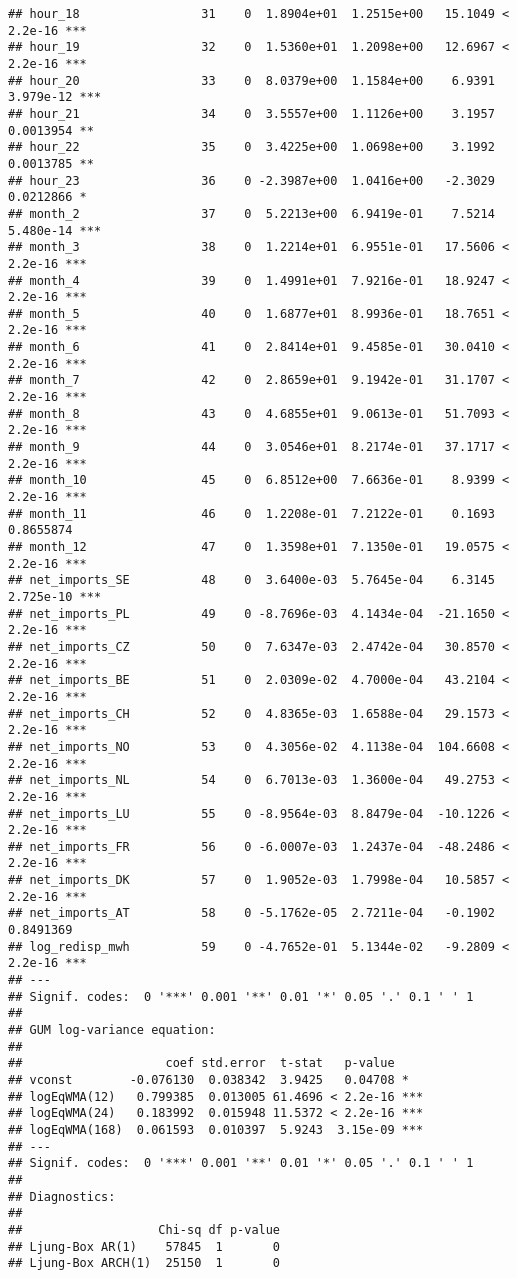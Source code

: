 \documentclass[
]{article}
\begin{document}
\begin{verbatim}
## hour_18                 31    0  1.8904e+01  1.2515e+00   15.1049 < 2.2e-16 ***
## hour_19                 32    0  1.5360e+01  1.2098e+00   12.6967 < 2.2e-16 ***
## hour_20                 33    0  8.0379e+00  1.1584e+00    6.9391 3.979e-12 ***
## hour_21                 34    0  3.5557e+00  1.1126e+00    3.1957 0.0013954 ** 
## hour_22                 35    0  3.4225e+00  1.0698e+00    3.1992 0.0013785 ** 
## hour_23                 36    0 -2.3987e+00  1.0416e+00   -2.3029 0.0212866 *  
## month_2                 37    0  5.2213e+00  6.9419e-01    7.5214 5.480e-14 ***
## month_3                 38    0  1.2214e+01  6.9551e-01   17.5606 < 2.2e-16 ***
## month_4                 39    0  1.4991e+01  7.9216e-01   18.9247 < 2.2e-16 ***
## month_5                 40    0  1.6877e+01  8.9936e-01   18.7651 < 2.2e-16 ***
## month_6                 41    0  2.8414e+01  9.4585e-01   30.0410 < 2.2e-16 ***
## month_7                 42    0  2.8659e+01  9.1942e-01   31.1707 < 2.2e-16 ***
## month_8                 43    0  4.6855e+01  9.0613e-01   51.7093 < 2.2e-16 ***
## month_9                 44    0  3.0546e+01  8.2174e-01   37.1717 < 2.2e-16 ***
## month_10                45    0  6.8512e+00  7.6636e-01    8.9399 < 2.2e-16 ***
## month_11                46    0  1.2208e-01  7.2122e-01    0.1693 0.8655874    
## month_12                47    0  1.3598e+01  7.1350e-01   19.0575 < 2.2e-16 ***
## net_imports_SE          48    0  3.6400e-03  5.7645e-04    6.3145 2.725e-10 ***
## net_imports_PL          49    0 -8.7696e-03  4.1434e-04  -21.1650 < 2.2e-16 ***
## net_imports_CZ          50    0  7.6347e-03  2.4742e-04   30.8570 < 2.2e-16 ***
## net_imports_BE          51    0  2.0309e-02  4.7000e-04   43.2104 < 2.2e-16 ***
## net_imports_CH          52    0  4.8365e-03  1.6588e-04   29.1573 < 2.2e-16 ***
## net_imports_NO          53    0  4.3056e-02  4.1138e-04  104.6608 < 2.2e-16 ***
## net_imports_NL          54    0  6.7013e-03  1.3600e-04   49.2753 < 2.2e-16 ***
## net_imports_LU          55    0 -8.9564e-03  8.8479e-04  -10.1226 < 2.2e-16 ***
## net_imports_FR          56    0 -6.0007e-03  1.2437e-04  -48.2486 < 2.2e-16 ***
## net_imports_DK          57    0  1.9052e-03  1.7998e-04   10.5857 < 2.2e-16 ***
## net_imports_AT          58    0 -5.1762e-05  2.7211e-04   -0.1902 0.8491369    
## log_redisp_mwh          59    0 -4.7652e-01  5.1344e-02   -9.2809 < 2.2e-16 ***
## ---
## Signif. codes:  0 '***' 0.001 '**' 0.01 '*' 0.05 '.' 0.1 ' ' 1
## 
## GUM log-variance equation:
## 
##                    coef std.error  t-stat   p-value    
## vconst        -0.076130  0.038342  3.9425   0.04708 *  
## logEqWMA(12)   0.799385  0.013005 61.4696 < 2.2e-16 ***
## logEqWMA(24)   0.183992  0.015948 11.5372 < 2.2e-16 ***
## logEqWMA(168)  0.061593  0.010397  5.9243  3.15e-09 ***
## ---
## Signif. codes:  0 '***' 0.001 '**' 0.01 '*' 0.05 '.' 0.1 ' ' 1
## 
## Diagnostics:
## 
##                   Chi-sq df p-value
## Ljung-Box AR(1)    57845  1       0
## Ljung-Box ARCH(1)  25150  1       0
\end{verbatim}
\end{document}
